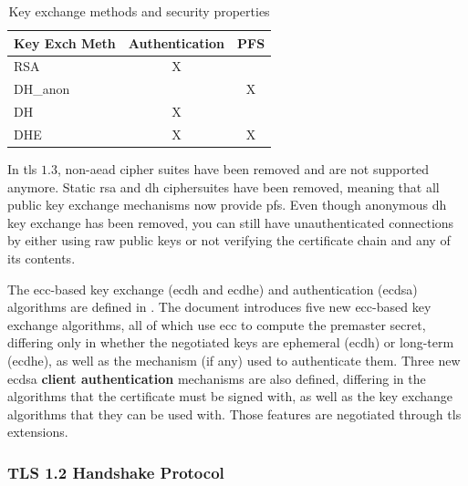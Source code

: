 \documentclass{llncs}
\begin{document}
\begin{table}[]
\centering
\caption{Key exchange methods and security properties}
\label{kemsp}
\begin{tabular}{|l|c|l|}
\hline
\textbf{Key Exch Meth} & \multicolumn{1}{l|}{Authentication} & PFS                    \\ \hline
RSA                          & X                                   &                        \\ \hline
DH\_anon                     & \multicolumn{1}{l|}{}               & \multicolumn{1}{c|}{X} \\ \hline
DH                           & X                                   &                        \\ \hline
DHE                          & X                                   & \multicolumn{1}{c|}{X} \\ \hline
\end{tabular}
\end{table}

In \gls{tls} $1.3$, non-\gls{aead} cipher suites have been removed and are not supported anymore.
Static \gls{rsa} and \gls{dh} ciphersuites have been removed, meaning that all
public key exchange mechanisms now provide \gls{pfs}. Even though
anonymous \gls{dh} key exchange has been removed, you can still have
unauthenticated connections by either using raw public keys\cite{RFC7250} or not verifying the certificate chain and any of its contents.

The \gls{ecc}-based key exchange (\gls{ecdh} and \gls{ecdhe}) and authentication (\gls{ecdsa})
algorithms are defined in \cite{RFC4292}. The document introduces five new
\gls{ecc}-based key exchange algorithms, all of which use \gls{ecc} to compute
the premaster secret, differing only in whether the negotiated
keys are ephemeral (\gls{ecdh}) or long-term (\gls{ecdhe}), as well as the mechanism (if any) used to
authenticate them. Three new \gls{ecdsa} \textbf{client authentication} mechanisms are also defined,
differing in the algorithms that the certificate must be signed with, as well
as the key exchange algorithms that they can be used with.
Those features are negotiated through \gls{tls} extensions.

\subsubsection{TLS 1.2 Handshake Protocol}
\end{document}
